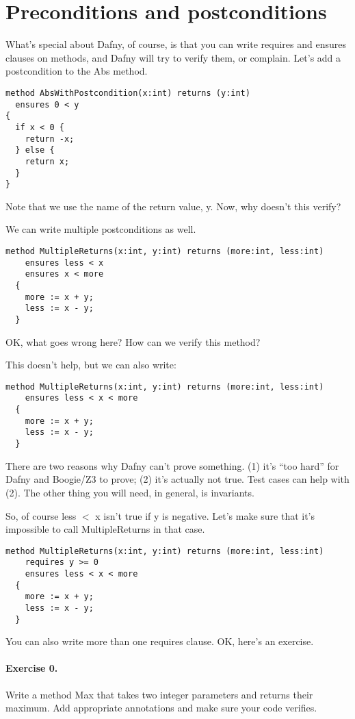 \documentclass[11pt]{article}
\begin{document}
\section*{Preconditions and postconditions}
What's special about Dafny, of course, is that you can write \textsf{requires}
and \textsf{ensures} clauses on methods, and Dafny will try to verify them, or
complain. Let's add a postcondition to the Abs method.
\begin{lstlisting}[language=dafny]
method AbsWithPostcondition(x:int) returns (y:int)
  ensures 0 < y
{
  if x < 0 {
    return -x;
  } else {
    return x;
  }
}
\end{lstlisting}
Note that we use the name of the return value, \textsf{y}. Now, why doesn't this verify?

We can write multiple postconditions as well.
\begin{lstlisting}[language=dafny]
  method MultipleReturns(x:int, y:int) returns (more:int, less:int)
    ensures less < x
    ensures x < more
  {
    more := x + y;
    less := x - y;
  }
\end{lstlisting}
OK, what goes wrong here? How can we verify this method?

This doesn't help, but we can also write:
\begin{lstlisting}[language=dafny]
  method MultipleReturns(x:int, y:int) returns (more:int, less:int)
    ensures less < x < more
  {
    more := x + y;
    less := x - y;
  }
\end{lstlisting}

There are two reasons why Dafny can't prove something.
(1) it's ``too hard'' for Dafny and Boogie/Z3 to prove; (2)
it's actually not true. Test cases can help with (2).
The other thing you will need, in general, is invariants.

So, of course \textsf{less $<$ x} isn't true if \textsf{y} is negative.
Let's make sure that it's impossible to call \textsf{MultipleReturns}
in that case.
\begin{lstlisting}[language=dafny]
  method MultipleReturns(x:int, y:int) returns (more:int, less:int)
    requires y >= 0
    ensures less < x < more
  {
    more := x + y;
    less := x - y;
  }
\end{lstlisting}
You can also write more than one requires clause. OK, here's an exercise.

\paragraph{Exercise 0.} Write a method \textsf{Max} that takes two
integer parameters and returns their maximum. Add appropriate annotations
and make sure your code verifies.
\end{document}
